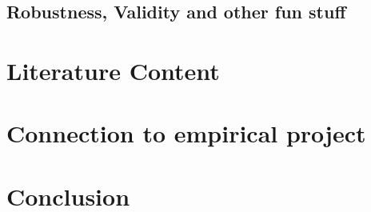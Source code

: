 \documentclass[12pt,draft,a4paper]{article}
\begin{document}
\subsection{Robustness, Validity and other fun stuff}








\section{Literature Content} %


\section{Connection to empirical project} %

\section{Conclusion}

% 
\newpage

% 

\end{document}
